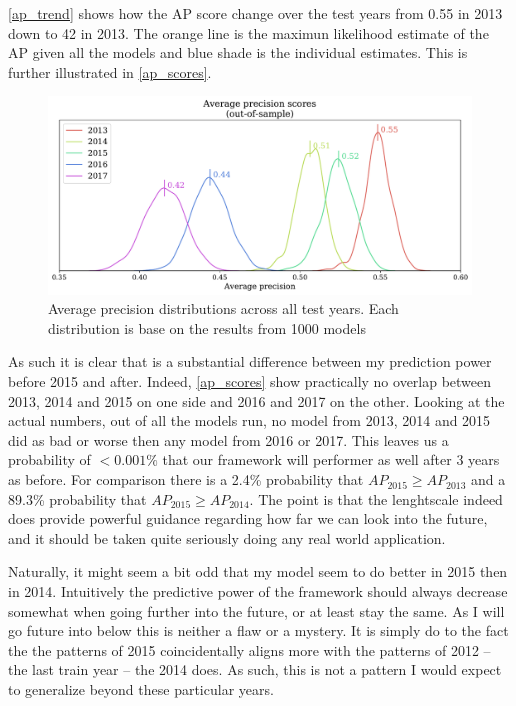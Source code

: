 \documentclass[a4paper]{article}
\begin{document}
\autoref{ap_trend} shows how the AP score change over the test years from 0.55 in 2013 down to 42 in 2013. The orange line is the maximun likelihood estimate of the AP given all the models and blue shade is the individual estimates. This is further illustrated in \autoref{ap_scores}.\par


\begin{figure}[!htb]
	\centering
	\includegraphics[scale=0.47]{ap_scores.pdf}
    \caption{\footnotesize{Average precision distributions across all test years. Each distribution is base on the results from 1000 models}}\label{ap_scores}
\end{figure}

As such it is clear that is a substantial difference between my prediction power before 2015 and after. Indeed, \autoref{ap_scores} show practically no overlap between 2013, 2014 and 2015 on one side and 2016 and 2017 on the other. Looking at the actual numbers, out of all the models run, no model from 2013, 2014 and 2015 did as bad or worse then any model from 2016 or 2017. This leaves us a probability of $<0.001\%$ that our framework will performer as well after 3 years as before. For comparison there is a 2.4\% probability that $AP_{2015} \geq AP_{2013}$ and a 89.3\% probability that $AP_{2015} \geq AP_{2014}$. The point is that the lenghtscale indeed does provide powerful guidance regarding how far we can look into the future, and it should be taken quite seriously doing any real world application.\par

Naturally, it might seem a bit odd that my model seem to do better in 2015 then in 2014. Intuitively the predictive power of the framework should always decrease somewhat when going further into the future, or at least stay the same. As I will go future into below this is neither a flaw or a mystery. It is simply do to the fact the the patterns of 2015 coincidentally aligns more with the patterns of 2012 -- the last train year -- the 2014 does. As such, this is not a pattern I would expect to generalize beyond these particular years.\par 
\end{document}
